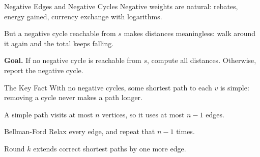 \documentclass[10pt,aspectratio=169]{beamer}
\begin{document}
\begin{frame}{Negative Edges and Negative Cycles}
  Negative weights are natural: rebates, energy gained, currency exchange
  with logarithms.

  \pause
  \bigskip
  But a \alert{negative cycle} reachable from $s$ makes distances
  meaningless: walk around it again and the total keeps falling.

  \bigskip
  \begin{center}
  \end{center}

  \pause
  \bigskip
  \textbf{Goal.} If no negative cycle is reachable from $s$, compute all
  distances. Otherwise, \alert{report} the negative cycle.
\end{frame}

\begin{frame}{The Key Fact}
  With no negative cycles, some shortest path to each $v$ is
  \alert{simple}: removing a cycle never makes a path longer.

  \bigskip
  A simple path visits at most $n$ vertices, so it uses
  \alert{at most $n - 1$ edges}.

  \pause
  \bigskip
  \begin{block}{Bellman-Ford}
    Relax \alert{every} edge, and repeat that $n - 1$ times.
  \end{block}

  \bigskip
  \begin{center}
    \small Round $k$ extends correct shortest paths by one more edge.
  \end{center}
\end{frame}
\end{document}
